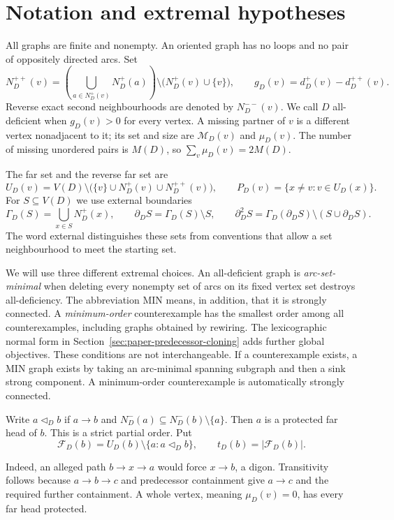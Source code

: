 \section{Notation and extremal hypotheses}\label{sec:paper-notation}
All graphs are finite and nonempty. An oriented graph has no loops and no
pair of oppositely directed arcs. Set
\[
 N_D^{++}(v)=\left(\bigcup_{a\in N_D^+(v)}N_D^+(a)\right)
       \setminus\bigl(N_D^+(v)\cup\{v\}\bigr),
 \qquad g_D(v)=d_D^+(v)-d_D^{++}(v).
\]
Reverse exact second neighbourhoods are denoted by $N_D^{--}(v)$.
We call $D$ all-deficient when $g_D(v)>0$ for every vertex. A missing
partner of $v$ is a different vertex nonadjacent to it; its set and size
are $\mathcal M_D(v)$ and $\mu_D(v)$. The number of missing unordered
pairs is $M(D)$, so $\sum_v\mu_D(v)=2M(D)$.

The far set and the reverse far set are
\[
 U_D(v)=V(D)\setminus\bigl(\{v\}\cup N_D^+(v)\cup N_D^{++}(v)\bigr),
 \qquad P_D(v)=\{x\ne v:v\in U_D(x)\}.
\]
For $S\subseteq V(D)$ we use external boundaries
\[
 \Gamma_D(S)=\bigcup_{x\in S}N_D^+(x),\qquad
 \partial_D S=\Gamma_D(S)\setminus S,\qquad
 \partial_D^2S=\Gamma_D(\partial_D S)\setminus(S\cup\partial_D S).
\]
The word external distinguishes these sets from conventions that allow a
set neighbourhood to meet the starting set.

We will use three different extremal choices. An all-deficient graph is
\emph{arc-set-minimal} when deleting every nonempty set of arcs on its fixed
vertex set destroys all-deficiency. The abbreviation MIN means, in addition,
that it is strongly connected. A \emph{minimum-order} counterexample has the
smallest order among all counterexamples, including graphs obtained by
rewiring. The lexicographic normal form in Section~\ref{sec:paper-predecessor-cloning}
adds further global objectives. These conditions are not interchangeable.
If a counterexample exists, a MIN graph exists by taking an arc-minimal
spanning subgraph and then a sink strong component. A minimum-order
counterexample is automatically strongly connected.

\begin{definition}[Protection]\label{def:paper-protection}
Write $a\triangleleft_D b$ if $a\to b$ and
$N_D^-(a)\subseteq N_D^-(b)\setminus\{a\}$.
Then $a$ is a protected far head of $b$. This is a strict partial order.
Put
\[
 \mathcal F_D(b)=U_D(b)\setminus\{a:a\triangleleft_D b\},
 \qquad t_D(b)=|\mathcal F_D(b)|.
\]
\end{definition}
Indeed, an alleged path $b\to x\to a$ would force $x\to b$, a digon.
Transitivity follows because $a\to b\to c$ and predecessor containment
give $a\to c$ and the required further containment. A whole vertex, meaning
$\mu_D(v)=0$, has every far head protected.

